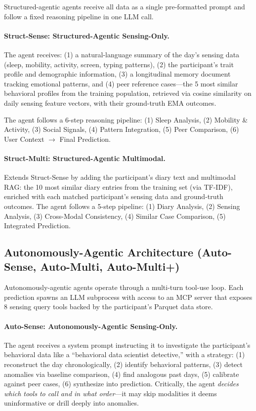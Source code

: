 \documentclass[screen,review,anonymous]{acmart}
\begin{document}
Structured-agentic agents receive all data as a single pre-formatted prompt and follow a fixed reasoning pipeline in one LLM call.

\paragraph{Struct-Sense: Structured-Agentic Sensing-Only.}
The agent receives: (1) a natural-language summary of the day's sensing data (sleep, mobility, activity, screen, typing patterns), (2) the participant's trait profile and demographic information, (3) a longitudinal memory document tracking emotional patterns, and (4) peer reference cases---the 5 most similar behavioral profiles from the training population, retrieved via cosine similarity on daily sensing feature vectors, with their ground-truth EMA outcomes.

The agent follows a 6-step reasoning pipeline: (1) Sleep Analysis, (2) Mobility \& Activity, (3) Social Signals, (4) Pattern Integration, (5) Peer Comparison, (6) User Context $\rightarrow$ Final Prediction.

\paragraph{Struct-Multi: Structured-Agentic Multimodal.}
Extends Struct-Sense by adding the participant's diary text and multimodal RAG: the 10 most similar diary entries from the training set (via TF-IDF), enriched with each matched participant's sensing data and ground-truth outcomes. The agent follows a 5-step pipeline: (1) Diary Analysis, (2) Sensing Analysis, (3) Cross-Modal Consistency, (4) Similar Case Comparison, (5) Integrated Prediction.

\subsection{Autonomously-Agentic Architecture (Auto-Sense, Auto-Multi, Auto-Multi+)}
\label{sec:agentic}

Autonomously-agentic agents operate through a multi-turn tool-use loop. Each prediction spawns an LLM subprocess with access to an MCP server that exposes 8 sensing query tools backed by the participant's Parquet data store.

\paragraph{Auto-Sense: Autonomously-Agentic Sensing-Only.}
The agent receives a system prompt instructing it to investigate the participant's behavioral data like a ``behavioral data scientist detective,'' with a strategy: (1) reconstruct the day chronologically, (2) identify behavioral patterns, (3) detect anomalies via baseline comparison, (4) find analogous past days, (5) calibrate against peer cases, (6) synthesize into prediction. Critically, the agent \emph{decides which tools to call and in what order}---it may skip modalities it deems uninformative or drill deeply into anomalies.
\end{document}
